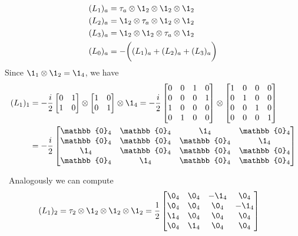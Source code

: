 \begin{align*}
    (L_1)_a&=\tau_a\otimes\1_2\otimes\1_2\otimes\1_2\\
    (L_2)_a&=\1_2\otimes\tau_a\otimes\1_2\otimes\1_2\\
    (L_3)_a&=\1_2\otimes\1_2\otimes\tau_a\otimes\1_2\\
    (L_0)_a&=-\bigg((L_1)_a+(L_2)_a+(L_3)_a\bigg)
\end{align*}
Since $\1_1\otimes\1_2=\1_4$, we have
\begin{align*}
    (L_1)_1&=-\frac{i}{2}\begin{bmatrix}
    0&1\\
    1&0
\end{bmatrix}\otimes\begin{bmatrix}
    1&0\\
    0&1
\end{bmatrix}\otimes\1_4=-\frac{i}{2}\begin{bmatrix}
    0&0&1&0\\
    0&0&0&1\\
    1&0&0&0\\
    0&1&0&0
\end{bmatrix}\otimes\begin{bmatrix}
    1&0&0&0\\
    0&1&0&0\\
    0&0&1&0\\
    0&0&0&1
\end{bmatrix}\\
&=-\frac{i}{2}\begin{bmatrix}
    \mathbb{0}_4&\mathbb{0}_4&\1_4&\mathbb{0}_4\\
    \mathbb{0}_4&\mathbb{0}_4&\mathbb{0}_4&\1_4\\
    \1_4&\mathbb{0}_4&\mathbb{0}_4&\mathbb{0}_4\\
    \mathbb{0}_4&\1_4&\mathbb{0}_4&\mathbb{0}_4
\end{bmatrix}
\end{align*}

\,\newline
Analogously we can compute
\begin{align*}
    (L_1)_2&=\tau_2\otimes\1_2\otimes\1_2\otimes\1_2=\frac{1}{2}\begin{bmatrix}
        \0_4&\0_4&-\1_4&\0_4\\
        \0_4&\0_4&\0_4&-\1_4\\
        \1_4&\0_4&\0_4&\0_4\\
        \0_4&\1_4&\0_4&\0_4
    \end{bmatrix}
\end{align*}

